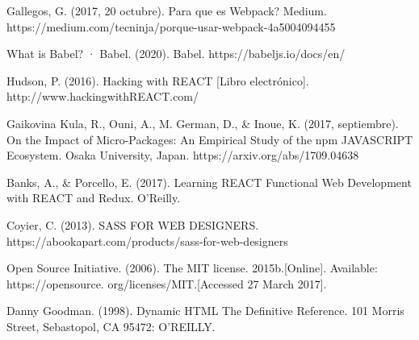 \begin{thebibliography}{100}
\bibitem{} Gallegos, G. (2017, 20 octubre). Para que es Webpack? Medium. https://medium.com/tecninja/porque-usar-webpack-4a5004094455

\bibitem{} What is Babel? · Babel. (2020). Babel. https://babeljs.io/docs/en/

\bibitem{} Hudson, P. (2016). Hacking with REACT [Libro electrónico]. http://www.hackingwithREACT.com/

\bibitem{} Gaikovina Kula, R., Ouni, A., M. German, D., & Inoue, K. (2017, septiembre). On the Impact of Micro-Packages: An Empirical Study of the npm JAVASCRIPT Ecosystem. Osaka University, Japan. https://arxiv.org/abs/1709.04638

\bibitem{} Banks, A., & Porcello, E. (2017). Learning REACT Functional Web Development with REACT and Redux. O’Reilly.

\bibitem{} Coyier, C. (2013). SASS FOR WEB DESIGNERS. https://abookapart.com/products/sass-for-web-designers

\bibitem{} Open Source Initiative. (2006). The MIT license. 2015b.[Online]. Available: https://opensource. org/licenses/MIT.[Accessed 27 March 2017].

\bibitem{} Danny Goodman. (1998). Dynamic HTML The Definitive Reference. 101 Morris Street, Sebastopol, CA 95472: O'REILLY.

\end{thebibliography}